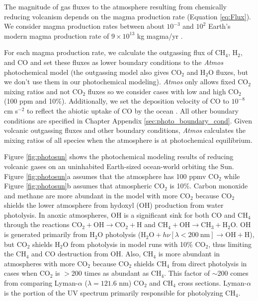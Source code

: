 The magnitude of gas fluxes to the atmosphere resulting from chemically reducing volcanism depends on the magma production rate (Equation \eqref{eq:Flux}). We consider magma production rates between about $10^{-3}$ and $10^2$ Earth’s modern magma production rate of $9\times10^{13}$ kg magma/yr \citep{Crisp_1984}. 

For each magma production rate, we calculate the outgassing flux of CH$_4$, H$_2$, and CO and set these fluxes as lower boundary conditions to the \textit{Atmos} photochemical model (the outgassing model also gives CO$_2$ and H$_2$O fluxes, but we don't use them in our photochemical modeling). \textit{Atmos} only allows fixed CO$_2$ mixing ratios and not CO$_2$ fluxes so we consider cases with low and high CO$_2$ (100 ppm and 10\%). Additionally, we set the deposition velocity of CO to $10^{-8}$ cm s$^{-2}$ to reflect the abiotic uptake of CO by the ocean \citep{Kharecha_2005}. All other boundary conditions are specified in Chapter Appendix \ref{sec:photo_boundary_cond}. Given volcanic outgassing fluxes and other boundary conditions, \textit{Atmos} calculates the mixing ratios of all species when the atmosphere is at photochemical equilibrium.

Figure \ref{fig:photosun} shows the photochemical modeling results of reducing volcanic gases on an uninhabited Earth-sized ocean-world orbiting the Sun. Figure \ref{fig:photosun}a assumes that the atmosphere has 100 ppmv CO$_2$ while Figure \ref{fig:photosun}b assumes that atmospheric CO$_2$ is 10\%. Carbon monoxide and methane are more abundant in the model with more CO$_2$ because CO$_2$ shields the lower atmosphere from hydoxyl (OH) production from water photolysis. In anoxic atmospheres, OH is a significant sink for both CO and CH$_4$ through the reactions $\mathrm{CO_2}+\mathrm{OH}\rightarrow \mathrm{CO_2}+\mathrm{H}$ and $\mathrm{CH_4}+\mathrm{OH}\rightarrow \mathrm{CH_3}+\mathrm{H_2O}$. OH is generated primarily from H$_2$O photolysis ($\mathrm{H_2O}+h \nu [\lambda<200 \:\mathrm{nm}]\rightarrow \mathrm{OH}+\mathrm{H}$), but CO$_2$ shields H$_2$O from photolysis in model runs with 10\% CO$_2$, thus limiting the CH$_4$ and CO destruction from OH. Also, CH$_4$ is more abundant in atmospheres with more CO$_2$ because CO$_2$ shields CH$_4$ from direct photolysis in cases when CO$_2$ is $>$200 times as abundant as CH$_4$. This factor of $\sim$200 comes from comparing Lyman-$\alpha$ ($\lambda=121.6$ nm) CO$_2$ and CH$_4$ cross sections. Lyman-$\alpha$ is the portion of the UV spectrum primarily responsible for photolyzing CH$_4$.

